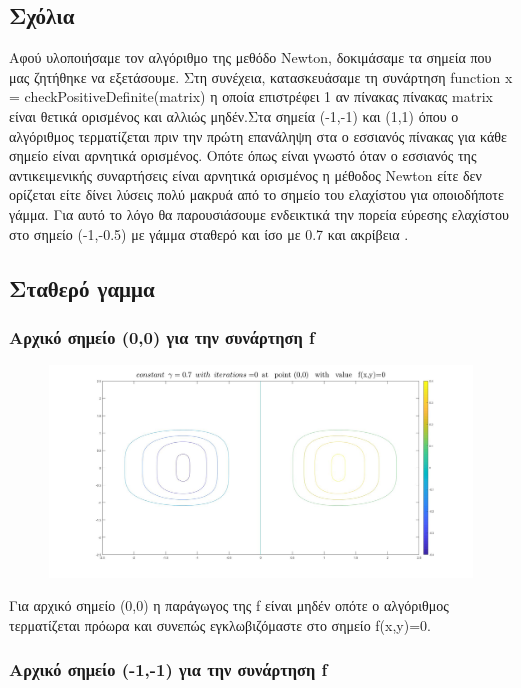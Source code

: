 \documentclass{article}
\begin{document}
\subsection*{Σχόλια}
Αφού υλοποιήσαμε τον αλγόριθμο της μεθόδο Newton, δοκιμάσαμε τα σημεία που μας ζητήθηκε να εξετάσουμε. Στη συνέχεια, κατασκευάσαμε τη συνάρτηση function x = checkPositiveDefinite(matrix) η οποία επιστρέφει 1 αν πίνακας πίνακας matrix είναι θετικά ορισμένος και αλλιώς μηδέν.Στα σημεία  (-1,-1) και (1,1) όπου ο αλγόριθμος τερματίζεται πριν την πρώτη επανάληψη στα  ο εσσιανός πίνακας για κάθε σημείο είναι αρνητικά ορισμένος. Οπότε όπως είναι γνωστό όταν ο εσσιανός της αντικειμενικής συναρτήσεις είναι αρνητικά ορισμένος η μέθοδος Newton είτε δεν ορίζεται είτε δίνει λύσεις πολύ μακρυά από  το σημείο του ελαχίστου για οποιοδήποτε γάμμα. Για αυτό το λόγο θα παρουσιάσουμε ενδεικτικά  την πορεία εύρεσης ελαχίστου στο σημείο  (-1,-0.5) με γάμμα σταθερό και ίσο με 0.7 και ακρίβεια .
 
\subsection*{Σταθερό γαμμα}
\subsubsection*{Αρχικό σημείο (0,0) για την συνάρτηση f}
\begin{figure}[h!]	
     \centering  
     \advance\leftskip-0.2cm  
  \includegraphics[width=140mm,scale=2]{n1aa.jpg}
\end{figure} 
Για αρχικό σημείο (0,0) η παράγωγος της f είναι μηδέν οπότε ο αλγόριθμος τερματίζεται πρόωρα και συνεπώς εγκλωβιζόμαστε στο σημείο f(x,y)=0.
\subsubsection*{Αρχικό σημείο (-1,-1) για την συνάρτηση f}
\end{document}
